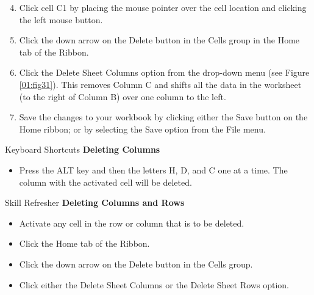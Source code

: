 \begin{enumerate}
	\setcounter{enumi}{3}
	\item Click cell C1 by placing the mouse pointer over the cell location and clicking the left mouse button.
	\item Click the down arrow on the Delete button in the Cells group in the Home tab of the Ribbon.
	\item Click the Delete Sheet Columns option from the drop-down menu (see Figure \ref{01:fig31}). This removes Column C and shifts all the data in the worksheet (to the right of Column B) over one column to the left.
	\item Save the changes to your workbook by clicking either the Save button on the Home ribbon; or by selecting the Save option from the File menu.
\end{enumerate}

\begin{center}
	\begin{shtcutbox}{Keyboard Shortcuts}
		\textbf{Deleting Columns}
		\\
		\begin{itemize}
			\setlength{\itemsep}{0pt}
			\setlength{\parskip}{0pt}
			\setlength{\parsep}{0pt}
			
			\item Press the ALT key and then the letters H, D, and C one at a time. The column with the activated cell will be deleted.
			
		\end{itemize}
	\end{shtcutbox}
\end{center}

\begin{center}
	\begin{sklbox}{Skill Refresher}
		\textbf{Deleting Columns and Rows}
		\\
		\begin{itemize}
			\setlength{\itemsep}{0pt}
			\setlength{\parskip}{0pt}
			\setlength{\parsep}{0pt}
			
			\item Activate any cell in the row or column that is to be deleted.
			\item Click the Home tab of the Ribbon.
			\item Click the down arrow on the Delete button in the Cells group.
			\item Click either the Delete Sheet Columns or the Delete Sheet Rows option.
			
		\end{itemize}
	\end{sklbox}
\end{center}

